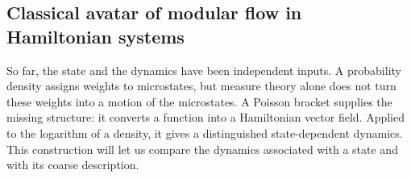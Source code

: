 \documentclass[a4paper,11pt]{article}
\theoremstyle{definition}
\begin{document}


\subsection{Classical avatar of modular flow in Hamiltonian systems}
\label{subsec:classical-state-flow}

So far, the state and the dynamics have been independent inputs. A probability density assigns weights to microstates, but measure theory alone does not turn these weights into a motion of the microstates. A Poisson bracket supplies the missing structure: it converts a function into a Hamiltonian vector field. Applied to the logarithm of a density, it gives a distinguished state-dependent dynamics. This construction will let us compare the dynamics associated with a state and with its coarse description.
\end{document}
